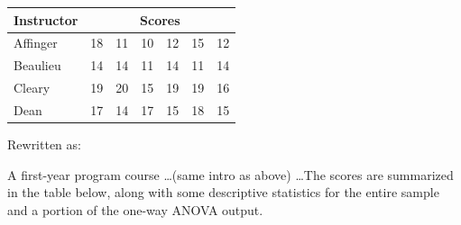 \begin{table}[!ht]


\begin{center}


\begin{tabular}{lllllll}


\textbf{Instructor} & \multicolumn{6}{c}{\textbf{Scores}}\\


\hline


Affinger & 18 & 11 & 10 & 12 & 15 & 12\\


Beaulieu & 14 & 14 & 11 & 14 & 11 & 14\\


Cleary & 19 & 20 & 15 & 19 & 19 & 16\\


Dean & 17 & 14 & 17 & 15 & 18 & 15\\


\hline


\end{tabular}


\end{center}


\end{table}





\noindent


Rewritten as:








A first-year program course \ldots (same intro as above) \ldots The scores are summarized in the table below, along with some descriptive statistics for the entire sample and a portion of the one-way ANOVA output.














